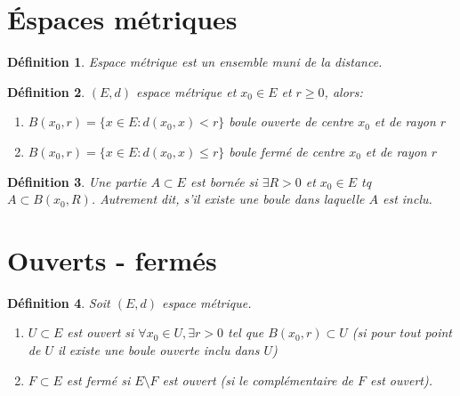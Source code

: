 \documentclass[a4paper]{article}
\newtheorem{definition}{Définition}[section]
\begin{document}
\section{Éspaces métriques}
\begin{definition}
    Espace métrique est un ensemble muni de la distance.
\end{definition}
\begin{definition}
    $(E, d)$ espace métrique et $x_0 \in E$ et $r \ge 0$, alors:
    \begin{enumerate}
        \item $B(x_0, r) = \{ x \in E : d(x_0, x) < r \}$ boule ouverte de centre $x_0$ et de rayon $r$
        \item $B(x_0, r) = \{ x \in E : d(x_0, x) \le  r \}$ boule fermé de centre $x_0$ et de rayon $r$
    \end{enumerate}
\end{definition}
\begin{definition}
    Une partie $A \subset E$ est bornée si $\exists R > 0$ et $x_0 \in E$ tq $A \subset B(x_0, R)$. Autrement dit, s'il existe une boule dans laquelle $A$ est inclu.
\end{definition}
\section{Ouverts - fermés}
\begin{definition}
    Soit $(E, d)$ espace métrique.
     \begin{enumerate}
        \item $U \subset E$ est ouvert si $\forall x_0 \in U, \exists r > 0$ tel que $B(x_0, r) \subset U$ (si pour tout point de $U$ il existe une boule ouverte inclu dans  $U$)
        \item $F \subset E$ est fermé si $E \setminus F$ est ouvert (si le complémentaire de $F$ est ouvert).
    \end{enumerate}
\end{definition}
\end{document}

